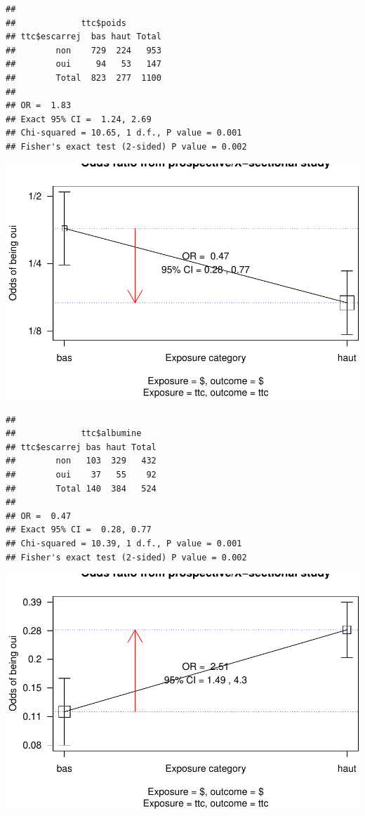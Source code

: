 \documentclass[]{article}
\begin{document}
\begin{verbatim}
## 
##             ttc$poids
## ttc$escarrej  bas haut Total
##        non    729  224   953
##        oui     94   53   147
##        Total  823  277  1100
## 
## OR =  1.83 
## Exact 95% CI =  1.24, 2.69  
## Chi-squared = 10.65, 1 d.f., P value = 0.001
## Fisher's exact test (2-sided) P value = 0.002
\end{verbatim}

\includegraphics{book_escarre_files/figure-latex/roc-5.pdf}

\begin{verbatim}
## 
##             ttc$albumine
## ttc$escarrej bas haut Total
##        non   103  329   432
##        oui    37   55    92
##        Total 140  384   524
## 
## OR =  0.47 
## Exact 95% CI =  0.28, 0.77  
## Chi-squared = 10.39, 1 d.f., P value = 0.001
## Fisher's exact test (2-sided) P value = 0.002
\end{verbatim}

\includegraphics{book_escarre_files/figure-latex/roc-6.pdf}
\end{document}
